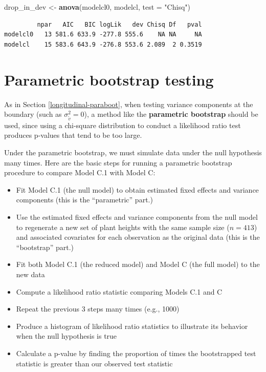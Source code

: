 \documentclass[
]{krantz}
\newenvironment{Shaded}{\begin{snugshade}}{\end{snugshade}}
\newcommand{\DataTypeTok}[1]{\textcolor[rgb]{0.27,0.27,0.27}{#1}}
\newcommand{\KeywordTok}[1]{\textcolor[rgb]{0.27,0.27,0.27}{\textbf{#1}}}
\newcommand{\NormalTok}[1]{#1}
\newcommand{\StringTok}[1]{\textcolor[rgb]{0.5,0.5,0.5}{#1}}
\providecommand{\tightlist}{%
  \setlength{\itemsep}{0pt}\setlength{\parskip}{0pt}}
\begin{document}
\begin{Shaded}
\begin{Highlighting}[]
\NormalTok{drop_in_dev <-}\StringTok{ }\KeywordTok{anova}\NormalTok{(modelcl0, modelcl, }\DataTypeTok{test =} \StringTok{"Chisq"}\NormalTok{)}
\end{Highlighting}
\end{Shaded}

\begin{verbatim}
         npar   AIC   BIC logLik   dev Chisq Df   pval
modelcl0   13 581.6 633.9 -277.8 555.6    NA NA     NA
modelcl    15 583.6 643.9 -276.8 553.6 2.089  2 0.3519
\end{verbatim}

\hypertarget{threelevel-paraboot}{%
\section{Parametric bootstrap testing}\label{threelevel-paraboot}}

As in Section \ref{longitudinal-paraboot}, when testing variance components at the boundary (such as \(\sigma_{\tilde{v}}^{2} = 0\)), a method like the \textbf{parametric bootstrap} should be used, since using a chi-square distribution to conduct a likelihood ratio test produces p-values that tend to be too large.

Under the parametric bootstrap, we must simulate data under the null hypothesis many times. Here are the basic steps for running a parametric bootstrap procedure to compare Model C.1 with Model C:

\begin{itemize}
\tightlist
\item
  Fit Model C.1 (the null model) to obtain estimated fixed effects and variance components (this is the ``parametric'' part.)
\item
  Use the estimated fixed effects and variance components from the null model to regenerate a new set of plant heights with the same sample size (\(n=413\)) and associated covariates for each observation as the original data (this is the ``bootstrap'' part.)
\item
  Fit both Model C.1 (the reduced model) and Model C (the full model) to the new data
\item
  Compute a likelihood ratio statistic comparing Models C.1 and C
\item
  Repeat the previous 3 steps many times (e.g., 1000)
\item
  Produce a histogram of likelihood ratio statistics to illustrate its behavior when the null hypothesis is true
\item
  Calculate a p-value by finding the proportion of times the bootstrapped test statistic is greater than our observed test statistic
\end{itemize}
\end{document}
